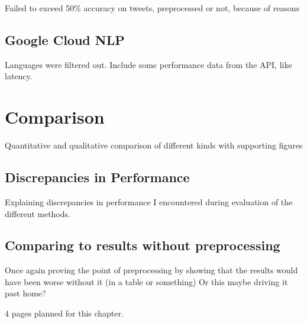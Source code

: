 Failed to exceed 50\% accuracy on tweets, preprocessed or not, because of reasons

\subsection{Google Cloud NLP}
\label{subsec:googleCloudNlp} %

Languages were filtered out.
Include some performance data from the API, like latency.

\section{Comparison}
\label{sec:comparison}

Quantitative and qualitative comparison of different kinds with supporting figures

\subsection{Discrepancies in Performance}
\label{subsec:discrepanciesinperformance}

Explaining discrepancies in performance I encountered during evaluation of the different methods.

\subsection{Comparing to results without preprocessing}
\label{subsec:comparingToResultsWithoutPreprocessing}

Once again proving the point of preprocessing by showing that the results would have been worse without it (in a table or something)
Or this maybe driving it past home?

4 pages planned for this chapter.
\pagebreak[4]
